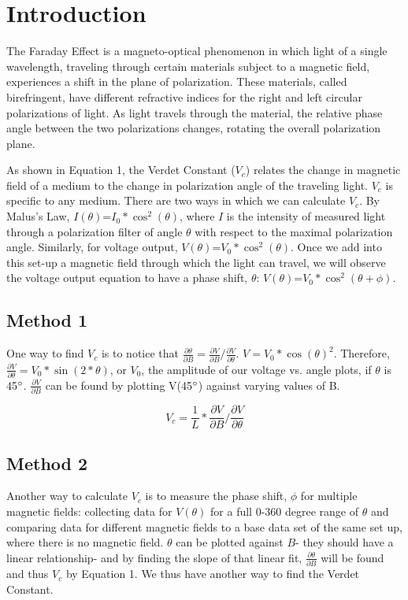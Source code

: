 \documentclass[prb,preprint]{revtex4-1}
\begin{document}
\section{Introduction} 

{The Faraday Effect is a magneto-optical phenomenon in which light of a single wavelength, traveling through certain materials subject to a magnetic field, experiences a shift in the plane of polarization. These materials, called birefringent, have different refractive indices for the right and left circular polarizations of light. As light travels through the material, the relative phase angle between the two polarizations changes, rotating the overall polarization plane.

As shown in Equation 1, the Verdet Constant ($V_{c}$) relates the change in magnetic field of a medium to the change in polarization angle of the traveling light.  $V_{c}$ is specific to any medium.  There are two ways in which we can calculate $V_{c}$.  By Malus's Law, $I(\theta)$=$I_{0}*\cos^{2}(\theta)$, where $I$ is the intensity of measured light through a polarization filter of angle $\theta$ with respect to the maximal polarization angle.  Similarly, for voltage output, $V(\theta)$=$V_{0}*\cos^{2}(\theta)$.  Once we add into this set-up a magnetic field through which the light can travel, we will observe the voltage output equation to have a phase shift, $\theta$:  $V(\theta)$=$V_{0}*\cos^{2}(\theta+\phi)$.

\subsection{Method 1}

{One way to find $V_{c}$ is to notice that $\frac{\partial \theta}{\partial B}=\frac{\partial V}{\partial B}/ \frac{\partial V}{\partial \theta}$.     $V=V_{0}*\cos(\theta)^{2}$.  Therefore,  $ \frac{\partial V}{\partial \theta} = V_{0}*\sin(2*\theta)$, or $V_{0}$, the amplitude of our voltage vs. angle plots, if $\theta$ is 45$\degree$.  $\frac{\partial V}{\partial B}$ can be found by plotting V(45$\degree$) against varying values of B. }

\begin{equation}
V_{c} =\frac{1}{L} * \frac{\partial V}{\partial B} /  \frac{\partial V}{\partial \theta} 
\end{equation}

\subsection{Method 2}

Another way to calculate $V_{c}$ is to measure the phase shift, $\phi$ for multiple magnetic fields:  collecting data for $V(\theta)$ for a full 0-360 degree range of $\theta$ and comparing data for different magnetic fields to a base data set of the same set up, where there is no magnetic field.  $\theta$ can be plotted against $B$- they should have a linear relationship- and by finding the slope of that linear fit, $\frac{\partial \theta}{\partial B}$ will be found and thus $V_{c}$ by Equation 1. We thus have another way to find the Verdet Constant.}
\end{document}
